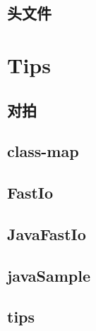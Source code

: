 \documentclass[10pt]{article}
\begin{document}
\subsection{头文件}


\section{Tips}
\subsection{对拍}

\subsection{class-map}

\subsection{FastIo}

\subsection{JavaFastIo}

\subsection{javaSample}

\subsection{tips}

\end{document}
